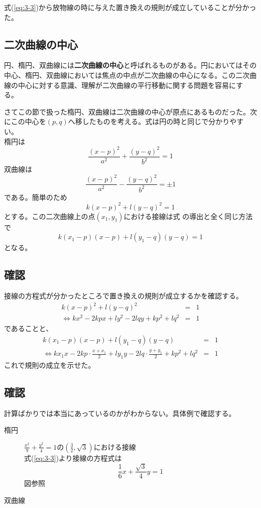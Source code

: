 \documentclass{jsarticle} \usepackage{graphics} \usepackage{amsmath} \usepackage{amssymb} \usepackage{cases}
\newcommand{\pt}{$(x_1,y_1)$}
\newcommand{\ptt}{$(p,q)$}
\begin{document}
    式(\ref{eq:3-3})から放物線の時に与えた置き換えの規則が成立していることが分かった。

    \subsection{二次曲線の中心}
    円、楕円、双曲線には{\bf 二次曲線の中心}と呼ばれるものがある。円においてはその中心、楕円、双曲線においては焦点の中点が二次曲線の中心になる。この二次曲線の中心に対する意識、理解が二次曲線の平行移動に関する問題を容易にする。

    さてこの節で扱った楕円、双曲線は二次曲線の中心が原点にあるものだった。次にこの中心を\ptt へ移したものを考える。式は円の時と同じで分かりやすい。\\
    楕円は
    \[
    \frac{(x-p)^2}{a^2} +\frac{(y-q)^2}{b^2}=1
    \]
    双曲線は
    \[
    \frac{(x-p)^2}{a^2} -\frac{(y-q)^2}{b^2}=\pm 1
    \]
    である。簡単のため
    \[
    k(x-p)^2+l(y-q)^2=1
    \]
    とする。この二次曲線上の点\pt における接線は式%
    の導出と全く同じ方法で
    \begin{equation}
        k(x_1-p)(x-p)+l(y_1-q)(y-q)=1
        \label{eq:3-4}
    \end{equation}
    となる。

    \subsection{確認}
    接線の方程式が分かったところで置き換えの規則が成立するかを確認する。
    \begin{eqnarray*}
        k(x-p)^2+l(y-q)^2&=&1\\
        \Leftrightarrow kx^2 -2kpx +ly^2 -2lqy +kp^2+lq^2 &=& 1
    \end{eqnarray*}
    であることと、
    \begin{eqnarray*}
        k(x_1-p)(x-p)+l(y_1-q)(y-q) &=& 1\\
        \Leftrightarrow kx_1 x -2kp \cdot \frac{x +x_1}{2} +ly_1 y -2lq \cdot \frac{y+y_1}{2} +kp^2 +lq^2 &=& 1
    \end{eqnarray*}
    これで規則の成立を示せた。

    \subsection{確認}
    計算ばかりでは本当にあっているのかがわからない。具体例で確認する。
    \begin{description}
        \item[楕円] $\frac{x^2}{9}+\frac{y^2}{4}=1$の$(\frac{3}{2},\sqrt{3})$における接線\\
        式(\ref{eq:3-3})より接線の方程式は
        \[
        \frac{1}{6}x+\frac{\sqrt{3}}{4}y=1
        \]
        図参照
        \item[双曲線] 
    \end{description}
\end{document}
